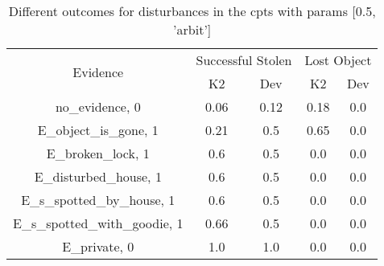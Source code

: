 \begin{table}\begin{tabular}{c|cc|cc}\toprule\multirow{2}{*}{Evidence} & \multicolumn{2}{c}{Successful Stolen} & \multicolumn{2}{c}{Lost Object} \\& {K2} & {Dev} & {K2} & {Dev} \\\midrule
no\_evidence, 0 & \cellcolor{Bittersweet}0.06&\cellcolor{Bittersweet}0.12&\cellcolor{Bittersweet}0.18&\cellcolor{Bittersweet}0.0\\E\_object\_is\_gone, 1 & \cellcolor{Bittersweet}0.21&\cellcolor{Bittersweet}0.5&\cellcolor{Bittersweet}0.65&\cellcolor{Bittersweet}0.0\\E\_broken\_lock, 1 & \cellcolor{Bittersweet}0.6&\cellcolor{Bittersweet}0.5&0.0&0.0\\E\_disturbed\_house, 1 & \cellcolor{Bittersweet}0.6&\cellcolor{Bittersweet}0.5&0.0&0.0\\E\_s\_spotted\_by\_house, 1 & \cellcolor{Bittersweet}0.6&\cellcolor{Bittersweet}0.5&0.0&0.0\\E\_s\_spotted\_with\_goodie, 1 & \cellcolor{Bittersweet}0.66&\cellcolor{Bittersweet}0.5&0.0&0.0\\E\_private, 0 & 1.0&1.0&0.0&0.0\\\bottomrule\end{tabular}\caption{Different outcomes for disturbances in the cpts with params [0.5, 'arbit']}\end{table}